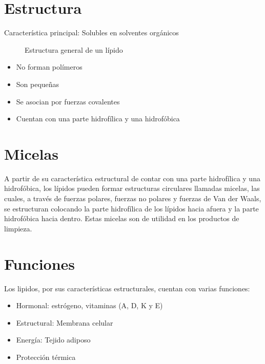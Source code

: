 

\section{Estructura}

Característica principal: Solubles en solventes orgánicos

\begin{figure}[H]
    \centering
    \caption{Estructura general de un lípido}
    \label{fig:estructura_lípidos}
\end{figure}

\begin{itemize}
    \item No forman polímeros
    \item Son pequeñas
    \item Se asocian por fuerzas covalentes
    \item Cuentan con una parte hidrofílica y una hidrofóbica
\end{itemize}

\section{Micelas}

A partir de su característica estructural de contar con una parte hidrofílica y una hidrofóbica, los lípidos pueden formar estructuras circulares llamadas micelas, las cuales, a través de fuerzas polares, fuerzas no polares y fuerzas de Van der Waals, se estructuran colocando la parte hidrofílica de los lípidos hacia afuera y la parte hidrofóbica hacia dentro. Estas micelas son de utilidad en los productos de limpieza.


\section{Funciones}

Los lipidos, por sus características estructurales, cuentan con varias funciones:

\begin{itemize}
    \item Hormonal: estrógeno, vitaminas (A, D, K y E)
    \item Estructural: Membrana celular
    \item Energía: Tejido adiposo
    \item Protección térmica
\end{itemize}